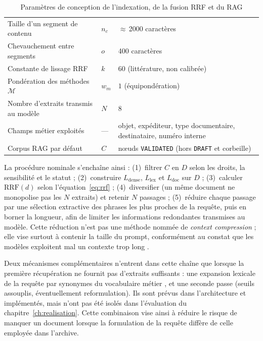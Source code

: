 \begin{table}[htbp]
\centering
\caption{Paramètres de conception de l'indexation, de la fusion RRF et du RAG}
\label{tab:params-rag-conception}
\small
\renewcommand{\arraystretch}{1.40}
\begingroup
{}
\begin{tabularx}{\textwidth}{@{}L{4.3cm} L{1.8cm} Y@{}}
\toprule
{}
 &
 &
 \\
\midrule
Taille d'un segment de contenu & $n_{c}$ & $\approx$\,2000 caractères \\
Chevauchement entre segments & $o$ & 400 caractères \\
Constante de lissage RRF & $k$ & 60 (littérature, non calibrée) \\
Pondération des méthodes $\mathcal{M}$ & $w_{m}$ & $1$ (équipondération) \\
Nombre d'extraits transmis au modèle & $N$ & 8 \\
Champs métier exploités & --- & objet, expéditeur, type documentaire, destinataire, numéro interne \\
Corpus RAG par défaut & $C$ & nœuds \texttt{VALIDATED} (hors \texttt{DRAFT} et corbeille) \\
\bottomrule
\end{tabularx}
\endgroup
\end{table}

La procédure nominale s'enchaîne ainsi : (1)~filtrer $C$ en $D$ selon les droits, la sensibilité et le statut ; (2)~construire $L_{\mathrm{dense}}$, $L_{\mathrm{lex}}$ et $L_{\mathrm{doc}}$ sur $D$ ; (3)~calculer $\mathrm{RRF}(d)$ selon l'équation~\eqref{eq:rrf} ; (4)~diversifier (un même document ne monopolise pas les $N$ extraits) et retenir $N$ passages ; (5)~réduire chaque passage par une sélection extractive des phrases les plus proches de la requête, puis en borner la longueur, afin de limiter les informations redondantes transmises au modèle. Cette réduction n'est pas une méthode nommée de \textit{context compression} ; elle vise surtout à contenir la taille du prompt, conformément au constat que les modèles exploitent mal un contexte trop long .

Deux mécanismes complémentaires n'entrent dans cette chaîne que lorsque la première récupération ne fournit pas d'extraits suffisants : une expansion lexicale de la requête par synonymes du vocabulaire métier , et une seconde passe (seuils assouplis, éventuellement reformulation). Ils sont prévus dans l'architecture et implémentés, mais n'ont pas été isolés dans l'évaluation du chapitre~\ref{ch:realisation}. Cette combinaison vise ainsi à réduire le risque de manquer un document lorsque la formulation de la requête diffère de celle employée dans l'archive.

